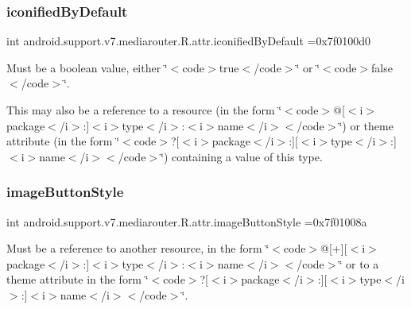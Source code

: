 \subsubsection{\texorpdfstring{iconified\+By\+Default}{iconifiedByDefault}}
{\footnotesize\ttfamily int android.\+support.\+v7.\+mediarouter.\+R.\+attr.\+iconified\+By\+Default =0x7f0100d0\hspace{0.3cm}{\ttfamily [static]}}

Must be a boolean value, either \char`\"{}$<$code$>$true$<$/code$>$\char`\"{} or \char`\"{}$<$code$>$false$<$/code$>$\char`\"{}. 

This may also be a reference to a resource (in the form \char`\"{}$<$code$>$@\mbox{[}$<$i$>$package$<$/i$>$\+:\mbox{]}$<$i$>$type$<$/i$>$\+:$<$i$>$name$<$/i$>$$<$/code$>$\char`\"{}) or theme attribute (in the form \char`\"{}$<$code$>$?\mbox{[}$<$i$>$package$<$/i$>$\+:\mbox{]}\mbox{[}$<$i$>$type$<$/i$>$\+:\mbox{]}$<$i$>$name$<$/i$>$$<$/code$>$\char`\"{}) containing a value of this type. \mbox{\label{classandroid_1_1support_1_1v7_1_1mediarouter_1_1R_1_1attr_ab224fe2322d8781a607f7384308300d0}} 
\subsubsection{\texorpdfstring{image\+Button\+Style}{imageButtonStyle}}
{\footnotesize\ttfamily int android.\+support.\+v7.\+mediarouter.\+R.\+attr.\+image\+Button\+Style =0x7f01008a\hspace{0.3cm}{\ttfamily [static]}}

Must be a reference to another resource, in the form \char`\"{}$<$code$>$@\mbox{[}+\mbox{]}\mbox{[}$<$i$>$package$<$/i$>$\+:\mbox{]}$<$i$>$type$<$/i$>$\+:$<$i$>$name$<$/i$>$$<$/code$>$\char`\"{} or to a theme attribute in the form \char`\"{}$<$code$>$?\mbox{[}$<$i$>$package$<$/i$>$\+:\mbox{]}\mbox{[}$<$i$>$type$<$/i$>$\+:\mbox{]}$<$i$>$name$<$/i$>$$<$/code$>$\char`\"{}. \mbox{\label{classandroid_1_1support_1_1v7_1_1mediarouter_1_1R_1_1attr_a21cd5b179ec241544f87b4e808a38dca}} 
